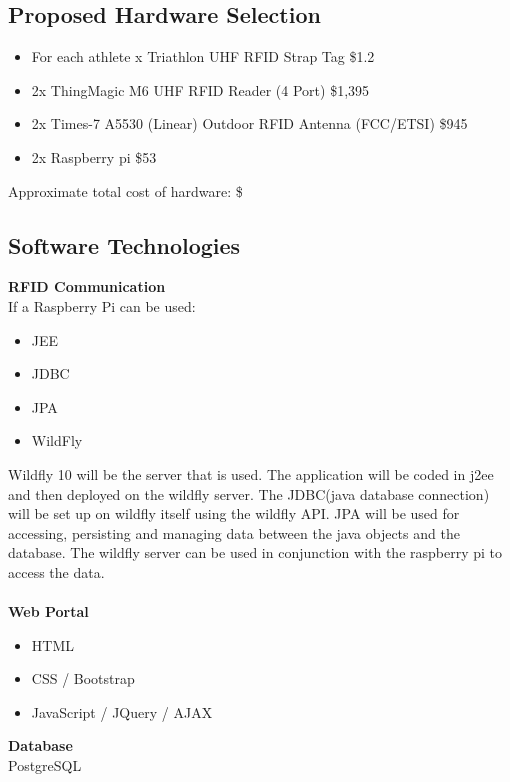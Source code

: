 \documentclass{article}
\begin{document}
\subsection{Proposed Hardware Selection}
 \begin{itemize} 
 	\item For each athlete x Triathlon UHF RFID Strap Tag \quad \$1.2
 	\item 2x ThingMagic M6 UHF RFID Reader (4 Port) \quad \$1,395
 	\item 2x  Times-7 A5530 (Linear) Outdoor RFID Antenna (FCC/ETSI) \quad \$945
 	\item 2x  Raspberry pi \quad \$53
 \end{itemize}
 
 Approximate total cost of hardware: \quad  \$

\subsection{Software Technologies}
\textbf{RFID Communication} \\
If a Raspberry Pi can be used:
\begin{itemize}
	\item JEE
	\item JDBC
	\item JPA
	\item WildFly
\end{itemize}
Wildfly 10 will be the server that is used. The application will be coded in j2ee and then deployed on the wildfly server. The JDBC(java database connection) will be set up on wildfly itself using the wildfly API. JPA will be used for accessing, persisting and managing data between the java objects and the database. The wildfly server can be used in conjunction with the raspberry pi to access the data. 
\\ \\
\textbf{Web Portal} 
\begin{itemize}
	\item HTML
	\item CSS / Bootstrap
	\item JavaScript / JQuery / AJAX
\end{itemize}
\textbf{Database} \\
PostgreSQL
\end{document}
